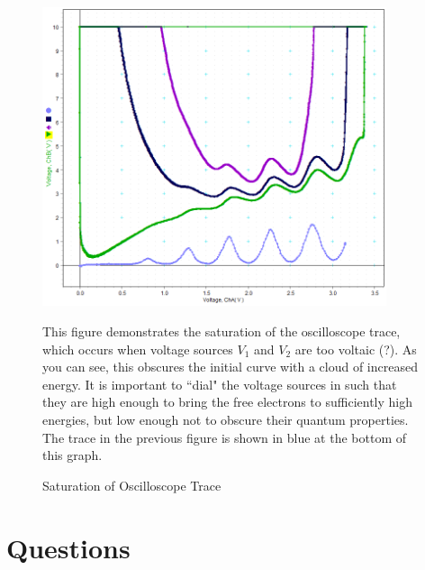 \documentclass{amsart}
\begin{document}
\begin{figure}[H]
    \begin{minipage}{0.66\textwidth}
        \centering
        \includegraphics[width=0.9\textwidth]{saturation.png}
        \caption{Saturation of Oscilloscope Trace}
    \end{minipage}
    \begin{minipage}{0.30\textwidth}
        This figure demonstrates the saturation of the oscilloscope trace, which occurs when voltage sources $V_1$ and $V_2$ are too voltaic (?). As you can see, this obscures the initial curve with a cloud of increased energy. It is important to ``dial" the voltage sources in such that they are high enough to bring the free electrons to sufficiently high energies, but low enough not to obscure their quantum properties. The trace in the previous figure is shown in blue at the bottom of this graph.
        \vspace{1.53cm}
        \medskip
    \end{minipage}
\end{figure}

\section{Questions}
\end{document}

